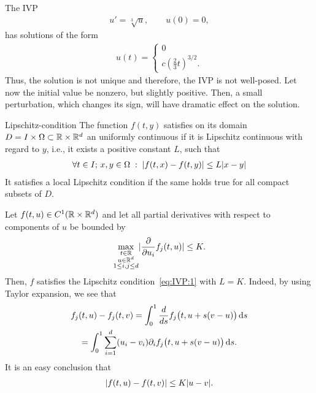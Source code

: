 \begin{example}
  The IVP
  \begin{gather*}
    u'= \sqrt[3]{u}, \qquad u(0) = 0,
  \end{gather*}
  has solutions of the form
  \begin{gather*}
    u(t) =
    \begin{cases}
      0 \\
      c \left(\tfrac23t\right)^{3/2}.
    \end{cases}
  \end{gather*}
  Thus, the solution is not unique and therefore, the IVP is not
  well-posed.
  Let now the initial value be nonzero, but slightly positive. Then, a small
  perturbation, which changes its sign, will have dramatic effect on
  the solution.
\end{example}

\begin{Definition}{Lipschitz-condition}
  The function $f(t,y)$ satisfies on its domain $D = I\times\Omega \subset
  \mathbb R \times \mathbb R^d$ an uniformly continuous  if 
	it is Lipschitz continuous with regard to $y$, i.e., it exists a 
	positive constant $L$, such that
  \begin{gather}
    \label{eq:IVP:1}
    \forall t\in I;\,x,y\in\Omega \;:\;
    \lvert f(t,x)-f(t,y)\rvert \le L \lvert x-y\rvert
  \end{gather}
  It satisfies a local Lipschitz condition if the same holds true for all 
  compact subsets of $D$.
\end{Definition}


\begin{example}
  Let $f(t,u)\in C^1(\mathbb R \times\mathbb R^d )$ and let all partial derivatives
  with respect to components of $u$ be bounded by
  \begin{gather*}
    \max_{\substack{t\in \mathbb R\\u\in \mathbb R^d\\1\le i,j \le d}}
   \lvert
     \frac{\partial}{\partial u_i} f_j(t,u)
   \rvert \le K.
  \end{gather*}
  Then, $f$ satisfies the Lipschitz condition~\eqref{eq:IVP:1} with
  $L=K$. Indeed, by using Taylor expansion, we see that
  \begin{multline*}
    f_j(t, u) - f_j(t,v)
    = \int_0^1 \frac{d}{ds}f_j\bigl(t,u+s(v-u)\bigr)\,\mathrm{d} s\\
    = \int_0^1 \sum_{i=1}^d(u_i-v_i)\partial_if_j\bigl(t,u+s(v-u)\bigr)\,\mathrm{d} s.
  \end{multline*}
  It is an easy conclusion that
  \begin{gather*}
    \lvert f(t,u)-f(t,v)\rvert
    \le K \lvert u-v\rvert.
  \end{gather*}
\end{example}


